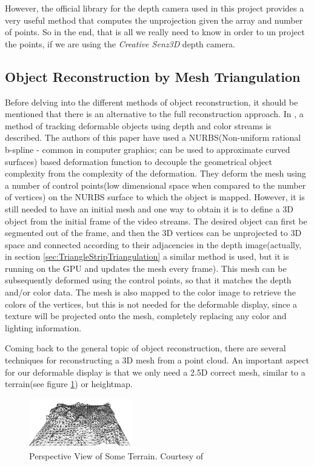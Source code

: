 \documentclass[]{article}
\begin{document}
 However, the official library for the depth camera used in this project provides a very useful method that computes the unprojection given the array and number of points. So in the end, that is all we really need to know in order to un project the points, if we are using the \textit{Creative Senz3D} depth camera.
 
\subsection{Object Reconstruction by Mesh Triangulation}

Before delving into the different methods of object reconstruction, it should be mentioned that there is an alternative to the full reconstruction approach. In \cite{Jordt2011}, a method of tracking deformable objects using depth and color streams is described. The authors of this paper have used a NURBS(Non-uniform rational b-spline - common in computer graphics; can be used to approximate curved surfaces) based deformation function to decouple the geometrical object complexity from the complexity of the deformation. They deform the mesh using a number of control points(low dimensional space when compared to the number of vertices) on the NURBS surface to which the object is mapped. However, it is still needed to have an initial mesh and one way to obtain it is to define a 3D object from the initial frame of the video streams. The desired object can first be segmented out of the frame, and then the 3D vertices can be unprojected to 3D space and connected according to their adjacencies in the depth image(actually, in section \ref{sec:TriangleStripTriangulation} a similar method is used, but it is running on the GPU and updates the mesh every frame). This mesh can be subsequently deformed using the control points, so that it matches the depth and/or color data. The mesh is also mapped to the color image to retrieve the colors of the vertices, but this is not needed for the deformable display, since a texture will be projected onto the mesh, completely replacing any color and lighting information.

Coming back to the general topic of object reconstruction, there are several techniques for reconstructing a 3D mesh from a point cloud. An important aspect for our deformable display is that we only need a 2.5D correct mesh, similar to a terrain(see figure \ref{fig:PerspectiveTerrain}) or heightmap. 

\begin{figure}[hbtp]
    \centering
    \includegraphics[width=0.4\textwidth]{figures/PerspectiveTerrain.PNG}
    \caption{Perspective View of Some Terrain. Courtesy of \cite[Chapter~9]{berg08}}
    \label{fig:PerspectiveTerrain}
\end{figure}
\end{document}
